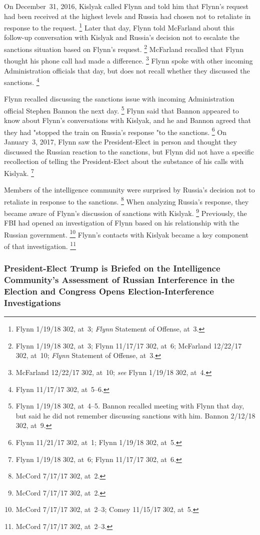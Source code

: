 On December~31, 2016, Kislyak called Flynn and told him that Flynn's request had been received at the highest levels and Russia had chosen not to retaliate in response to the request.%
\footnote{Flynn 1/19/18 302, at~3;
\textit{Flynn} Statement of Offense, at~3.}
Later that day, Flynn told McFarland about this follow-up conversation with Kislyak and Russia's decision not to escalate the sanctions situation based on Flynn's request.%
\footnote{Flynn 1/19/18 302, at~3;
Flynn 11/17/17 302, at~6;
McFarland 12/22/17 302, at~10;
\textit{Flynn} Statement of Offense, at~3.}
McFarland recalled that Flynn thought his phone call had made a difference.%
\footnote{McFarland 12/22/17 302, at~10;
\textit{see} Flynn 1/19/18 302, at~4.}
Flynn spoke with other incoming Administration officials that day, but does not recall whether they discussed the sanctions.%
\footnote{Flynn 11/17/17 302, at~5--6.}

Flynn recalled discussing the sanctions issue with incoming Administration official Stephen Bannon the next day.%
\footnote{Flynn 1/19/18 302, at~4--5.
Bannon recalled meeting with Flynn that day, but said he did not remember discussing sanctions with him.
Bannon 2/12/18 302, at~9.}
Flynn said that Bannon appeared to know about Flynn's conversations with Kislyak, and he and Bannon agreed that they had "stopped the train on Russia's response "to the sanctions.%
\footnote{Flynn 11/21/17 302, at~1;
Flynn 1/19/18 302, at~5.}
On January~3, 2017, Flynn saw the President-Elect in person and thought they discussed the Russian reaction to the sanctions, but Flynn did not have a specific recollection of telling the President-Elect about the substance of his calls with Kislyak.%
\footnote{Flynn 1/19/18 302, at~6;
Flynn 11/17/17 302, at~6.}

Members of the intelligence community were surprised by Russia's decision not to retaliate in response to the sanctions.%
\footnote{McCord 7/17/17 302, at~2.}
When analyzing Russia's response, they became aware of Flynn's discussion of sanctions with Kislyak.%
\footnote{McCord 7/17/17 302, at~2.}
Previously, the FBI had opened an investigation of Flynn based on his relationship with the Russian government.%
\footnote{McCord 7/17/17 302, at~2--3;
Comey 11/15/17 302, at~5.}
Flynn's contacts with Kislyak became a key component of that investigation.%
\footnote{McCord 7/17/17 302, at~2--3.}

\subsubsection{President-Elect Trump is Briefed on the Intelligence Community's Assessment of Russian Interference in the Election and Congress Opens Election-Interference Investigations}

